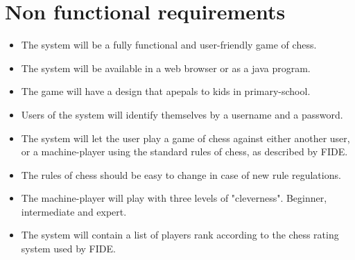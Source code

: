 \documentclass[norsk]{article}
\begin{document}
\begin{itemize}
\end{itemize}

\section{Non functional requirements}
\begin{itemize}
	\item 
	The system will be a fully functional and user-friendly game of chess. 
	\item 
	The system will be available in a web browser or as a java program.
	\item 
	The game will have a design that apepals to kids in primary-school.
	\item 
	Users of the system will identify themselves by a username and a password. 
	\item 
	The system will let the user play a game of chess against either another user, or a machine-player using the standard rules of chess, as described by FIDE.
	\item 
	The rules of chess should be easy to change in case of new rule regulations.
	\item 
	The machine-player will play with three levels of "cleverness". Beginner, intermediate and expert.
	\item 
	The system will contain a list of players rank according to the chess rating system used by FIDE.
	
\end{itemize}

 
\end{document}
